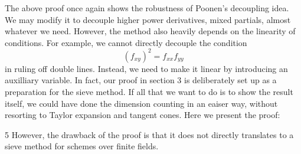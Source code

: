 \documentclass[12pt]{article}
\theoremstyle{plain}
\theoremstyle{definition}
\renewcommand{\deg}{\mathrm{deg}\,}
\renewcommand\dim{{\rm dim\,}}
\newcommand{\<}{\langle}
\renewcommand{\>}{\rangle}
\newcommand{\p}{\partial}
\begin{document}
The above proof once again shows the robustness of Poonen's decoupling idea. We may modify it to decouple higher power derivatives, mixed partials, almost whatever we need. However, the method also heavily depends on the linearity of conditions. For example, we cannot directly decouple the condition 
$$ (f_{xy})^2 = f_{xx} f_{yy} $$
in ruling off double lines. Instead, we need to make it linear by introducing an auxilliary variable. In fact, our proof in section 3 is deliberately set up as a preparation for the sieve method. If all that we want to do is to show the result itself, we could have done the dimension counting in an eaiser way, without resorting to Taylor expansion and tangent cones. Here we present the proof:

5 However, the drawback of the proof is that it does not directly translates to a sieve method for schemes over finite fields. 
\end{document}
